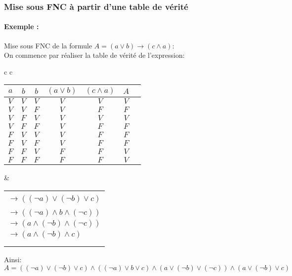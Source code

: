 \documentclass{scrartcl}
\newcommand{\exemple}[1]{\paragraph{Exemple : } #1\\}
\begin{document}
			\subsubsection{Mise sous FNC à partir d'une table de vérité}
				\exemple{Mise sous FNC de la formule $A = (a\vee b) \rightarrow (c \wedge a)$:}
					On commence par réaliser la table de vérité de l'expression:
					\begin{center}
					\begin{tabular}{c c}
					\begin{tabular}{| c c c | c | c | c | c }
						\hline
						$a$ & $b$ & $b$   &  $(a\vee b)$ & $(c \wedge a)$ & $A$ \\
						\hline
						$V$ & $V$ & $V$   &     $V$      &     $V$        & $V$ \\
						\hline
						$V$ & $V$ & $F$   &     $V$      &     $F$        & $F$ \\
						\hline
						$V$ & $F$ & $V$   &     $V$      &     $V$        & $V$ \\
						\hline
						$V$ & $F$ & $F$   &     $V$      &     $F$        & $F$ \\
						\hline
						$F$ & $V$ & $V$   &     $V$      &     $F$        & $F$ \\
						\hline
						$F$ & $V$ & $F$   &     $V$      &     $F$        & $F$ \\
						\hline
						$F$ & $F$ & $V$   &     $F$      &     $F$        & $V$ \\
						\hline
						$F$ & $F$ & $F$   &     $F$      &     $F$        & $V$ \\
						\hline
					\end{tabular}
					& \begin{tabular}{l}
					\\ \\ $\rightarrow ((\neg a) \vee (\neg b) \vee c)$ \\ \\
					$\rightarrow ((\neg a) \wedge b \wedge (\neg c))$ \\
					$\rightarrow (a \wedge (\neg b) \wedge (\neg c))$ \\
					$\rightarrow (a \wedge (\neg b) \wedge c)$ \\ \\ \\ 
					\end{tabular}
					\end{tabular}
					\end{center}
					Ainsi:
					\[ 
						\boxed{A = ((\neg a) \vee (\neg b) \vee c) \wedge ((\neg a) \vee b \vee c) \wedge (a \vee (\neg b) \vee (\neg c)) \wedge (a \vee (\neg b) \vee c)}
					\]
\end{document}
